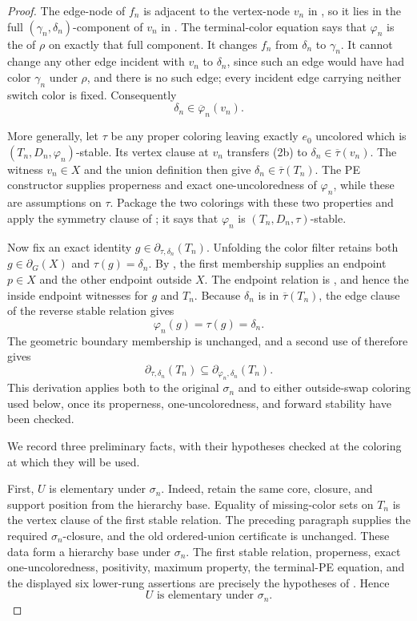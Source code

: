 \begin{proof}
The edge-node of $f_n$ is adjacent to the vertex-node $v_n$ in
, so it lies in the full
$(\gamma_n,\delta_n)$-component of $v_n$ in
.  The terminal-color equation says that
$\varphi_n$ is the  of $\rho$ on exactly
that full component.  It changes $f_n$ from $\delta_n$ to $\gamma_n$.
It cannot change any other edge incident with $v_n$ to $\delta_n$, since
such an edge would have had color $\gamma_n$ under $\rho$, and there is no
such edge; every incident edge carrying neither switch color is fixed.
Consequently
\[
              \delta_n\in\overline\varphi_n(v_n).             \tag{2b}
\]

More generally, let $\tau$ be any proper coloring leaving exactly $e_0$
uncolored which is $(T_n,D_n,\varphi_n)$-stable.  Its vertex clause at
$v_n$ transfers (2b) to
$\delta_n\in\overline\tau(v_n)$.  The witness $v_n\in X$ and the union
definition  then give
$\delta_n\in\overline\tau(T_n)$.  The PE constructor supplies properness
and exact one-uncoloredness of $\varphi_n$, while these are assumptions on
$\tau$.  Package the two colorings with these two properties and apply the
symmetry clause of ; it says that $\varphi_n$ is
$(T_n,D_n,\tau)$-stable.

Now fix an exact identity
$g\in\partial_{\tau,\delta_n}(T_n)$.  Unfolding the color filter
 retains both
$g\in\partial_G(X)$ and $\tau(g)=\delta_n$.  By
, the first membership supplies an endpoint
$p\in X$ and the other endpoint outside $X$.  The endpoint relation is
, and hence the inside endpoint witnesses
 for $g$ and $T_n$.  Because $\delta_n$ is in
$\overline\tau(T_n)$, the edge clause of the reverse stable relation gives
\[
                 \varphi_n(g)=\tau(g)=\delta_n.                \tag{2c}
\]
The geometric boundary membership is unchanged, and a second use of
 therefore gives
\[
 \partial_{\tau,\delta_n}(T_n)
       \subseteq\partial_{\varphi_n,\delta_n}(T_n).             \tag{2d}
\]
This derivation applies both to the original $\sigma_n$ and to either
outside-swap coloring used below, once its properness,
one-uncoloredness, and forward stability have been checked.

We record three preliminary facts, with their hypotheses checked at the
coloring at which they will be used.

First, $U$ is elementary under $\sigma_n$.  Indeed, retain the same
core, closure, and support position from the hierarchy base.  Equality
of missing-color sets on $T_n$ is the vertex clause of the first stable
relation.  The preceding paragraph supplies the required
$\sigma_n$-closure, and the old ordered-union certificate is unchanged.
These data form a hierarchy base under $\sigma_n$.  The first stable
relation, properness, exact one-uncoloredness, positivity, maximum
property, the terminal-PE equation, and the displayed six lower-rung
assertions are precisely the hypotheses of
.  Hence
\[
                  U\text{ is elementary under }\sigma_n.   \tag{3}
\]


\end{proof}
